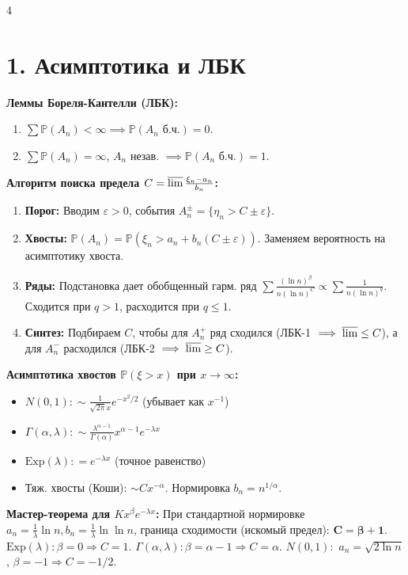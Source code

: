 \documentclass[8pt, a4paper, landscape]{extarticle}
\renewcommand{\P}{\mathbb{P}}
\begin{document}
\begin{multicols*}{4}

\section*{1. Асимптотика и ЛБК}
\textbf{Леммы Бореля-Кантелли (ЛБК):}
\begin{enumerate}
    \item $\sum \P(A_n) < \infty \implies \P(A_n \text{ б.ч.}) = 0$.
    \item $\sum \P(A_n) = \infty$, $A_n$ незав. $\implies \P(A_n \text{ б.ч.}) = 1$.
\end{enumerate}

\textbf{Алгоритм поиска предела $C = \varlimsup \frac{\xi_n - a_n}{b_n}$:}
\begin{enumerate}
    \item \textbf{Порог:} Вводим $\varepsilon>0$, события $A_n^\pm = \{ \eta_n > C \pm \varepsilon \}$.
    \item \textbf{Хвосты:} $\P(A_n) = \P(\xi_n > a_n + b_n(C \pm \varepsilon))$. Заменяем вероятность на асимптотику хвоста.
    \item \textbf{Ряды:} Подстановка дает обобщенный гарм. ряд $\sum \frac{(\ln n)^\beta}{n(\ln n)^C} \propto \sum \frac{1}{n(\ln n)^q}$. Сходится при $q>1$, расходится при $q \le 1$.
    \item \textbf{Синтез:} Подбираем $C$, чтобы для $A_n^+$ ряд сходился (ЛБК-1 $\implies \varlimsup \le C$), а для $A_n^-$ расходился (ЛБК-2 $\implies \varlimsup \ge C$).
\end{enumerate}

\textbf{Асимптотика хвостов $\P(\xi > x)$ при $x \to \infty$:}
\begin{itemize}
    \item $N(0,1): \sim \frac{1}{\sqrt{2\pi} x} e^{-x^2/2}$ (убывает как $x^{-1}$)
    \item $\Gamma(\alpha, \lambda): \sim \frac{\lambda^{\alpha-1}}{\Gamma(\alpha)} x^{\alpha-1} e^{-\lambda x}$
    \item $\text{Exp}(\lambda): = e^{-\lambda x}$ (точное равенство)
    \item Тяж. хвосты (Коши): $\sim C x^{-\alpha}$. Нормировка $b_n=n^{1/\alpha}$.
\end{itemize}

\textbf{Мастер-теорема для $K x^\beta e^{-\lambda x}$:}
При стандартной нормировке $a_n = \frac{1}{\lambda}\ln n, b_n = \frac{1}{\lambda}\ln\ln n$, граница сходимости (искомый предел): $\mathbf{C = \beta + 1}$.
$\text{Exp}(\lambda): \beta=0 \Rightarrow C=1$. 
$\Gamma(\alpha, \lambda): \beta=\alpha-1 \Rightarrow C=\alpha$. 
$N(0,1):$ $a_n=\sqrt{2\ln n}$, $\beta=-1 \Rightarrow C=-1/2$.


\end{multicols*}
\end{document}
